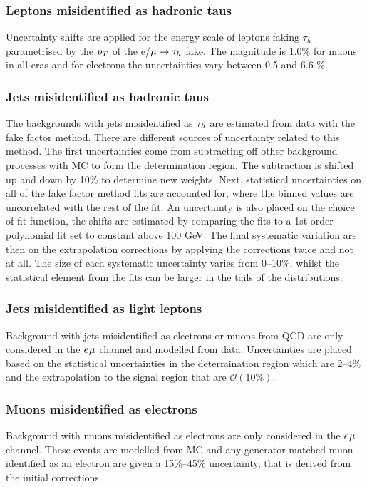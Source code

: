 \subsubsection{Leptons misidentified as hadronic taus}
Uncertainty shifts are applied for the energy scale of leptons faking $\tau_h$ parametrised by the $p_{T}$ of the e/$\mu\rightarrow\tau_{h}$ fake.
The magnitude is 1.0\% for muons in all eras and for electrons the uncertainties vary between 0.5 and 6.6 \%.

\subsubsection{Jets misidentified as hadronic taus}
The backgrounds with jets misidentified as $\tau_{h}$ are estimated from data with the fake factor method. 
There are different sources of uncertainty related to this method.
The first uncertainties come from subtracting off other background processes with MC to form the determination region. 
The subtraction is shifted up and down by 10\% to determine new weights.
Next, statistical uncertainties on all of the fake factor method fits are accounted for, where the binned values are uncorrelated with the rest of the fit.
An uncertainty is also placed on the choice of fit function, the shifts are estimated by comparing the fits to a 1st order polynomial fit set to constant above 100 GeV.
The final systematic variation are then on the extrapolation corrections by applying the corrections twice and not at all.
The size of each systematic uncertainty varies from 0--10\%, whilst the statistical element from the fits can be larger in the tails of the distributions.

\subsubsection{Jets misidentified as light leptons}
Background with jets misidentified as electrons or muons from QCD are only considered in the $e_{}\mu_{}$ channel and modelled from data.
Uncertainties are placed based on the statistical uncertainties in the determination region which are 2--4\% and the extrapolation to the signal region that are $\mathcal{O}(10\%)$.

\subsubsection{Muons misidentified as electrons}
Background with muons misidentified as electrons are only considered in the $e_{}\mu_{}$ channel.
These events are modelled from MC and any generator matched muon identified as an electron are given a 15\%--45\% uncertainty, that is derived from the initial corrections.

